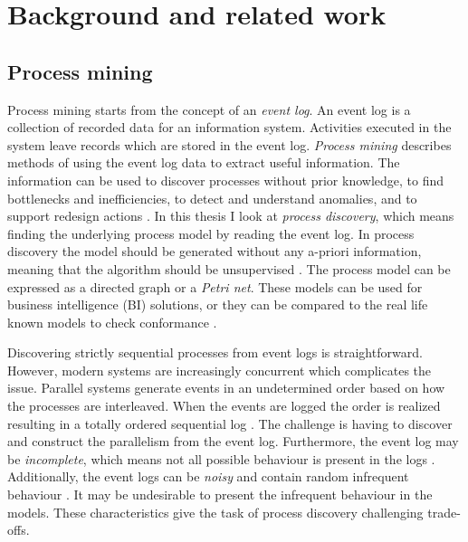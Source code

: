 
\clearpage
\section{Background and related work}
\label{sec:background}

\subsection{Process mining}

Process mining starts from the concept of an \emph{event log}.
An event log is a collection of recorded data for an information system.
Activities executed in the system leave records which are stored in the event log.
\emph{Process mining} describes methods of using the event log data to extract useful information.
The information can be used to discover processes without prior knowledge, to find bottlenecks and inefficiencies, to detect and understand anomalies, and to support redesign actions \cite{van2015extracting}.
In this thesis I look at \emph{process discovery}, which means finding the underlying process model
by reading the event log.
In process discovery the model should be generated without any a-priori information, meaning that the algorithm should be unsupervised \cite{van2013discovering}.
The process model can be expressed as a directed graph or a \emph{Petri net}.
These models can be used for business intelligence (BI) solutions, or they can be compared to the real life
known models to check conformance \cite{van2013discovering}.


Discovering strictly sequential processes from event logs is straightforward. However, modern systems are increasingly concurrent which complicates the issue. 
Parallel systems generate events in an undetermined order based on how the processes are interleaved. 
When the events are logged the order is realized resulting in a totally ordered sequential log \cite{van2004workflow}. 
The challenge is having to discover and construct the parallelism from the event log.
Furthermore, the event log may be \emph{incomplete}, which means not all possible behaviour is present in the logs \cite{van2013discovering}.
Additionally, the event logs can be \emph{noisy} and contain random infrequent behaviour \cite{van2013discovering}.
It may be undesirable to present the infrequent behaviour in the models.
These characteristics give the task of process discovery challenging trade-offs.

